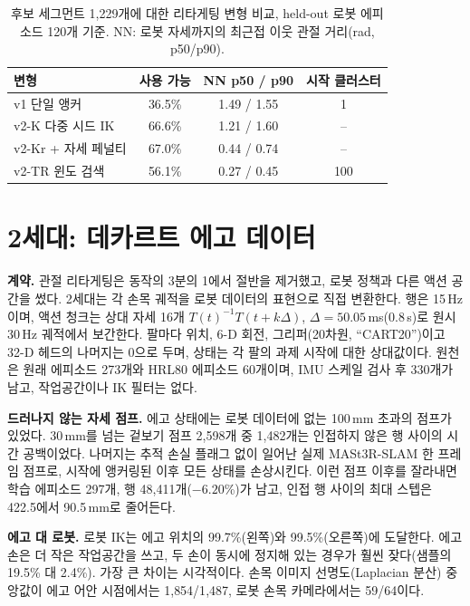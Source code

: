 \documentclass[conference,10pt]{IEEEtran}
\newcommand{\mm}{\,mm\xspace}
\begin{document}
\begin{table}[t]
\centering\footnotesize\setlength{\tabcolsep}{3.5pt}
\caption{후보 세그먼트 1{,}229개에 대한 리타게팅 변형 비교, held-out 로봇 에피소드 120개 기준. NN: 로봇 자세까지의 최근접 이웃 관절
거리(rad, p50/p90).}
\label{tab:retarget}
\begin{tabular}{@{}lccc@{}}
\toprule
변형 & 사용 가능 & NN p50 / p90 & 시작 클러스터 \\
\midrule
v1 단일 앵커 & 36.5\% & 1.49 / 1.55 & 1 \\
v2-K 다중 시드 IK & 66.6\% & 1.21 / 1.60 & -- \\
v2-Kr + 자세 페널티 & 67.0\% & 0.44 / 0.74 & -- \\
v2-TR 윈도 검색 & 56.1\% & 0.27 / 0.45 & 100 \\
\bottomrule
\end{tabular}
\end{table}

\section{2세대: 데카르트 에고 데이터}\label{sec:gen2}
\textbf{계약.} 관절 리타게팅은 동작의 3분의 1에서 절반을 제거했고, 로봇 정책과 다른 액션 공간을 썼다. 2세대는 각 손목 궤적을 로봇
데이터의 표현으로 직접 변환한다. 행은 15\,Hz이며, 액션 청크는 상대 자세 16개 $T(t)^{-1}T(t+k\Delta)$, $\Delta=50.05$\,ms(0.8\,s)로
원시 30\,Hz 궤적에서 보간한다. 팔마다 위치, 6-D 회전, 그리퍼(20차원, ``CART20'')이고 32-D 헤드의 나머지는 0으로 두며, 상태는 각 팔의
과제 시작에 대한 상대값이다. 원천은 원래 에피소드 273개와 HRL80 에피소드 60개이며, IMU 스케일 검사 후 330개가 남고, 작업공간이나 IK
필터는 없다.

\textbf{드러나지 않는 자세 점프.} 에고 상태에는 로봇 데이터에 없는 100\mm 초과의 점프가 있었다. 30\mm{}를 넘는 겉보기 점프
2{,}598개 중 1{,}482개는 인접하지 않은 행 사이의 시간 공백이었다. 나머지는 추적 손실 플래그 없이 일어난 실제 MASt3R-SLAM 한 프레임
점프로, 시작에 앵커링된 이후 모든 상태를 손상시킨다. 이런 점프 이후를 잘라내면 학습 에피소드 297개, 행 48{,}411개($-6.20$\%)가
남고, 인접 행 사이의 최대 스텝은 422.5에서 90.5\mm{}로 줄어든다.

\textbf{에고 대 로봇.} 로봇 IK는 에고 위치의 99.7\%(왼쪽)와 99.5\%(오른쪽)에 도달한다. 에고 손은 더 작은 작업공간을 쓰고, 두 손이
동시에 정지해 있는 경우가 훨씬 잦다(샘플의 19.5\% 대 2.4\%). 가장 큰 차이는 시각적이다. 손목 이미지 선명도(Laplacian 분산)
중앙값이 에고 어안 시점에서는 1{,}854/1{,}487, 로봇 손목 카메라에서는 59/64이다.
\end{document}
